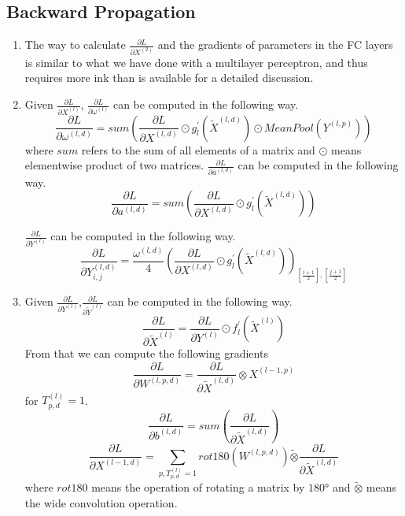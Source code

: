 \documentclass[11pt,a4paper]{article}
\begin{document}
\subsection{Backward Propagation}
\begin{enumerate}
\item{} The way to calculate $\frac{\partial{}L}{\partial{}X^{(2)}}$ and the gradients of parameters in the FC layers is similar to what we have done with a multilayer perceptron, and thus requires more ink than is available for a detailed discussion.
\item Given $\frac{\partial{}L}{\partial{}X^{(l)}}$, $\frac{\partial{}L}{\partial{}\omega^{(l)}}$ can be computed in the following way.
\begin{displaymath}
\frac{\partial{}L}{\partial{}\omega^{(l,d)}}=sum(\frac{\partial{}L}{\partial{}X^{(l,d)}}\odot{}g^{'}_{l}(\tilde{X}^{(l,d)})\odot{}MeanPool(Y^{(l,p)}))
\end{displaymath}
where $sum$ refers to the sum of all elements of a matrix and $\odot$ means elementwise product of two matrices.
$\frac{\partial{}L}{\partial{}a^{(l,d)}}$ can be computed in the following way.
\begin{displaymath}
\frac{\partial{}L}{\partial{}a^{(l,d)}}=sum(\frac{\partial{}L}{\partial{}X^{(l,d)}}\odot{}g^{'}_{l}(\tilde{X}^{(l,d)}))
\end{displaymath}

$\frac{\partial{}L}{\partial{}Y^{(l)}}$ can be computed in the following way.
\begin{displaymath}
\frac{\partial{}L}{\partial{}Y^{(l,d)}_{i,j}}=\frac{\omega^{(l,d)}}{4}(\frac{\partial{}L}{\partial{}X^{(l,d)}}\odot{}g^{'}_{l}(\tilde{X}^{(l,d)}))_{[\frac{i+1}{2}],[\frac{j+1}{2}]}
\end{displaymath}

\item{}Given $\frac{\partial{}L}{\partial{}Y^{(l)}}$,$\frac{\partial{}L}{\partial{}\tilde{Y}^{(l)}}$ can be computed in the following way.
\begin{displaymath}
\frac{\partial{}L}{\partial{}\tilde{X}^{(l)}} = \frac{\partial{}L}{\partial{}Y^{(l)}}\odot{}f^{'}_{l}(\tilde{X}^{(l)})
\end{displaymath}
From that we can compute the following gradients
\begin{displaymath}
\frac{\partial{}L}{\partial{}W^{(l,p,d)}}=\frac{\partial{}L}{\partial{}\tilde{X}^{(l,d)}}\otimes{}X^{(l-1,p)}
\end{displaymath}
for $T^{(l)}_{p,d} = 1$.
\begin{displaymath}
\frac{\partial{}L}{\partial{}b^{(l,d)}} = sum(\frac{\partial{}L}{\partial{}\tilde{X}^{(l,d)}})
\end{displaymath}
\begin{displaymath}
\frac{\partial{}L}{\partial{}X^{(l-1,d)}}= \sum_{p,T^{(l)}_{p,d}=1}rot180(W^{(l,p,d)})\tilde{\otimes{}}\frac{\partial{}L}{\partial{}\tilde{X}^{(l,d)}}
\end{displaymath}
where $rot180$ means the operation of rotating a matrix by $\ang{180}$ and $\tilde{\otimes{}}$ means the wide convolution operation.
\end{enumerate}
\end{document}
